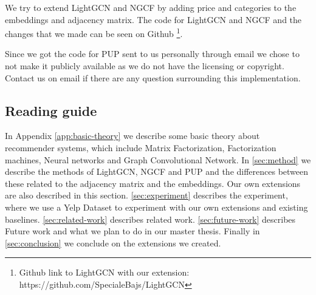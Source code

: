 We try to extend LightGCN and NGCF by adding price and categories to the embeddings and adjacency matrix.
The code for LightGCN and NGCF and the changes that we made can be seen on Github \footnote{Github link to LightGCN with our extension: https://github.com/SpecialeBajs/LightGCN}.

Since we got the code for PUP sent to us personally through email we chose to not make it publicly available as we do not have the licensing or copyright.
Contact us on email if there are any question surrounding this implementation.

\subsection{Reading guide}
In Appendix \ref{app:basic-theory} we describe some basic theory about recommender systems, which include Matrix Factorization, Factorization machines, Neural networks and Graph Convolutional Network.
In \autoref{sec:method} we describe the methods of LightGCN, NGCF and PUP and the differences between these related to the adjacency matrix and the embeddings.
Our own extensions are also described in this section.
\autoref{sec:experiment} describes the experiment, where we use a Yelp Dataset to experiment with our own extensions and existing baselines.
\autoref{sec:related-work} describes related work.
\autoref{sec:future-work} describes Future work and what we plan to do in our master thesis.
Finally in \autoref{sec:conclusion} we conclude on the extensions we created.
